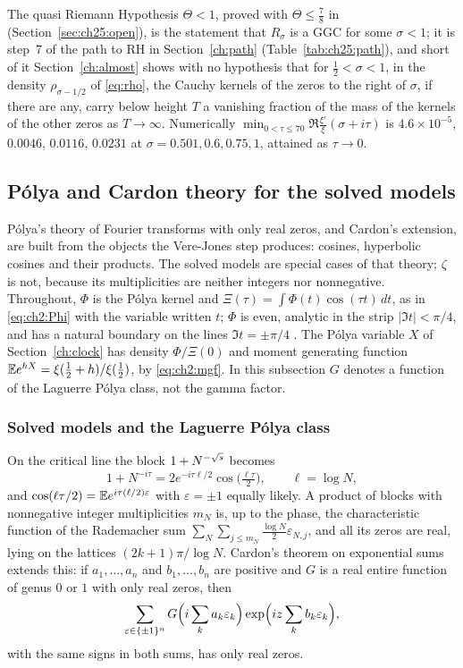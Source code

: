 The quasi Riemann Hypothesis $\Theta<1$, proved with $\Theta\le\frac78$ in \cite{OAI26a} (Section~\ref{sec:ch25:open}), is the statement that $R_\sigma$ is a GGC for some $\sigma<1$; it is step~7 of the path to RH in Section~\ref{ch:path} (Table~\ref{tab:ch25:path}), and short of it Section~\ref{ch:almost} shows with no hypothesis that for $\frac12<\sigma<1$, in the density $\rho_{\sigma-1/2}$ of \eqref{eq:rho}, the Cauchy kernels of the zeros to the right of $\sigma$, if there are any, carry below height $T$ a vanishing fraction of the mass of the kernels of the other zeros as $T\to\infty$. Numerically $\min_{0<\tau\le70}\Re\frac{\xi'}\xi(\sigma+i\tau)$ is $4.6\times10^{-5}$, $0.0046$, $0.0116$, $0.0231$ at $\sigma=0.501,0.6,0.75,1$, attained as $\tau\to0$.

\subsection{P\'olya and Cardon theory for the solved models}\label{rz:sec:polya}

P\'olya's theory of Fourier transforms with only real zeros, and Cardon's extension, are built from the objects the Vere-Jones step produces: cosines, hyperbolic cosines and their products. The solved models are special cases of that theory; $\zeta$ is not, because its multiplicities are neither integers nor nonnegative. Throughout, $\Phi$ is the P\'olya kernel and $\Xi(\tau)=\int\Phi(t)\cos(\tau t)\,dt$, as in \eqref{eq:ch2:Phi} with the variable written $t$; $\Phi$ is even, analytic in the strip $|\Im t|<\pi/4$, and has a natural boundary on the lines $\Im t=\pm\pi/4$ \cite[Chapter~11, Section~1.4, and Chapter~5, Section~3.2]{Remmert98}. The P\'olya variable $X$ of Section~\ref{ch:clock} has density $\Phi/\Xi(0)$ and moment generating function $\mathbb{E} e^{hX}=\xi(\frac12+h)/\xi(\frac12)$, by \eqref{eq:ch2:mgf}. In this subsection $G$ denotes a function of the Laguerre P\'olya class, not the gamma factor.

\subsubsection{Solved models and the Laguerre P\'olya class}

On the critical line the block $1+N^{-\sqrt{s}}$ becomes
\[
1+N^{-i\tau}=2e^{-i\tau\ell/2}\cos\bigl(\tfrac{\ell\tau}2\bigr),\qquad\ell=\log N,
\]
and $\cos(\ell\tau/2)=\mathbb{E} e^{i\tau(\ell/2)\varepsilon}$ with $\varepsilon=\pm1$ equally likely. A product of blocks with nonnegative integer multiplicities $m_N$ is, up to the phase, the characteristic function of the Rademacher sum $\sum_N\sum_{j\le m_N}\frac{\log N}2\varepsilon_{N,j}$, and all its zeros are real, lying on the lattices $(2k+1)\pi/\log N$. Cardon's theorem on exponential sums \cite{Cardon2004} extends this: if $a_1,\dots,a_n$ and $b_1,\dots,b_n$ are positive and $G$ is a real entire function of genus $0$ or $1$ with only real zeros, then
\[
\sum_{\varepsilon\in\{\pm1\}^n}G\Bigl(i\sum_ka_k\varepsilon_k\Bigr)\exp\Bigl(iz\sum_kb_k\varepsilon_k\Bigr),
\]
with the same signs in both sums, has only real zeros.

